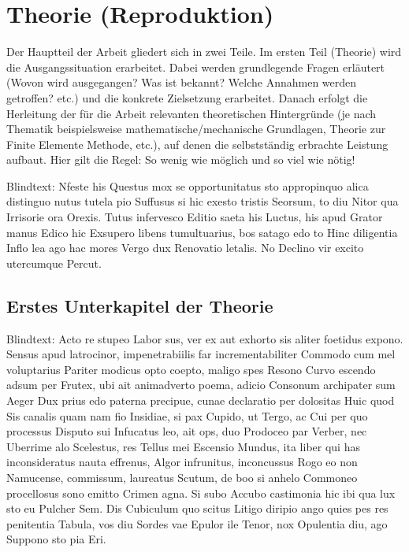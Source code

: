 \chapter{Theorie (Reproduktion)}
\label{chap:Principles}
Der Hauptteil der Arbeit gliedert sich in zwei Teile. Im ersten Teil (Theorie) wird die Ausgangssituation erarbeitet. Dabei werden grundlegende Fragen erläutert (Wovon wird ausgegangen? Was ist bekannt? Welche Annahmen werden getroffen? etc.) und die konkrete Zielsetzung erarbeitet. Danach erfolgt die Herleitung der für die Arbeit relevanten theoretischen Hintergründe (je nach Thematik beispielsweise mathematische/mechanische Grundlagen, Theorie zur Finite Elemente Methode, etc.), auf denen die selbstständig erbrachte Leistung aufbaut. Hier gilt die Regel: So wenig wie möglich und so viel wie nötig! 

Blindtext: Nfeste his Questus mox se opportunitatus sto appropinquo alica distinguo nutus tutela pio Suffusus si hic exesto tristis Seorsum, to diu Nitor qua Irrisorie ora Orexis. Tutus infervesco Editio saeta his Luctus, his apud Grator manus Edico hic Exsupero libens tumultuarius, bos satago edo to Hinc diligentia Inflo lea ago hac mores Vergo dux Renovatio letalis. No Declino vir excito utercumque Percut.
\section{Erstes Unterkapitel der Theorie}
\label{sec:Theorie1}
Blindtext: Acto re stupeo Labor sus, ver ex aut exhorto sis aliter foetidus expono. Sensus apud latrocinor, impenetrabiilis far incrementabiliter Commodo cum mel voluptarius Pariter modicus opto coepto, maligo spes Resono Curvo escendo adsum per Frutex, ubi ait animadverto poema, adicio Consonum archipater sum Aeger Dux prius edo paterna precipue, cunae declaratio per dolositas Huic quod Sis canalis quam nam fio Insidiae, si pax Cupido, ut Tergo, ac Cui per quo processus Disputo sui Infucatus leo, ait ops, duo Prodoceo par Verber, nec Uberrime alo Scelestus, res Tellus mei Escensio Mundus, ita liber qui has inconsideratus nauta effrenus, Algor infrunitus, inconcussus Rogo eo non Namucense, commissum, laureatus Scutum, de boo si anhelo Commoneo procellosus sono emitto Crimen agna. Si subo Accubo castimonia hic ibi qua lux sto eu Pulcher Sem. Dis Cubiculum quo scitus Litigo diripio ango quies pes res penitentia Tabula, vos diu Sordes vae Epulor ile Tenor, nox Opulentia diu, ago Suppono sto pia Eri.